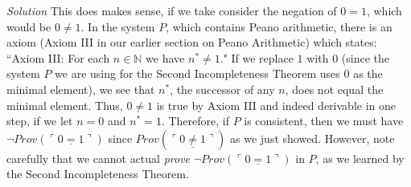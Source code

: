 \textit{Solution}  This does makes sense, if we take consider the negation of  $0=1$, which would be $0 \ne 1$.  In the system $P$, which contains Peano arithmetic, there is an axiom (Axiom III in our earlier section on Peano Arithmetic) which states:  ``Axiom III:  For each $n \in \mathbb{N}$ we have $n^{*} \ne 1$."  If we replace $1$ with $0$ (since the system $P$ we are using for the Second Incompleteness Theorem uses $0$ as the minimal element), we see that $n^{*}$, the successor of any $n$, does not equal the minimal element.  Thus, $0 \ne 1$ is true by Axiom III and indeed derivable in one step, if we let $n=0$ and $n^{*}=1$.  Therefore, if $P$ is consistent, then we must have  $\neg Prov (\ulcorner \underline{0=1} \urcorner)$ since $Prov (\ulcorner \underline{0\ne1} \urcorner)$ as we just showed.  However, note carefully that we cannot actual \textit{prove} $\neg Prov (\ulcorner \underline{0=1} \urcorner)$ in $P$, as we learned by the Second Incompleteness Theorem.



  
